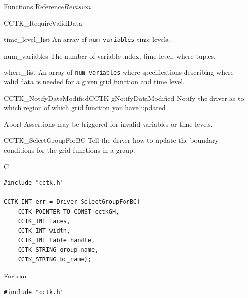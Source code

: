 \begin{cactuspart}{ Functions Reference}{}{$Revision$}
\begin{FunctionDescription}{CCTK\_RequireValidData}
\begin{ParameterSection}
\begin{Parameter}{time\_level\_list}
An array of \texttt{num\_variables} time levels.
\end{Parameter}

\begin{Parameter}{num\_variables}
The number of variable index, time level, where tuples.
\end{Parameter}

\begin{Parameter}{where\_list}
An array of \texttt{num\_variables} where specifications describing
where valid data is needed for a given grid function and time level.
\end{Parameter}
\end{ParameterSection}

\begin{SeeAlsoSection}
\begin{SeeAlso2}{CCTK\_NotifyDataModified}{CCTK-gNotifyDataModified}
Notify the driver as to which region of which grid function you have updated.
\end{SeeAlso2}
\end{SeeAlsoSection}

\begin{ErrorSection}
\begin{Error}{Abort}
Assertions may be triggered for invalid variables or time levels.
\end{Error}
\end{ErrorSection}
\end{FunctionDescription}

\begin{FunctionDescription}{CCTK\_SelectGroupForBC}
\label{CCTK-gSelectGroupForBC}
Tell the driver how to update the boundary conditions for the grid functions in a group.
\begin{SynopsisSection}
\begin{Synopsis}{C}
\begin{verbatim}
#include "cctk.h"

CCTK_INT err = Driver_SelectGroupForBC(
    CCTK_POINTER_TO_CONST cctkGH,
    CCTK_INT faces,
    CCTK_INT width,
    CCTK_INT table handle,
    CCTK_STRING group_name,
    CCTK_STRING bc_name);

\end{verbatim}
\end{Synopsis}
\begin{Synopsis}{Fortran}
\begin{verbatim}
#include "cctk.h"


\end{verbatim}
\end{Synopsis}
\end{SynopsisSection}
\end{FunctionDescription}
\end{cactuspart}
